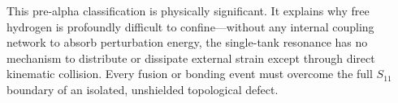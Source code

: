 This pre-alpha classification is physically significant. It explains why free hydrogen is profoundly difficult to confine---without any internal coupling network to absorb perturbation energy, the single-tank resonance has no mechanism to distribute or dissipate external strain except through direct kinematic collision. Every fusion or bonding event must overcome the full $S_{11}$ boundary of an isolated, unshielded topological defect.

